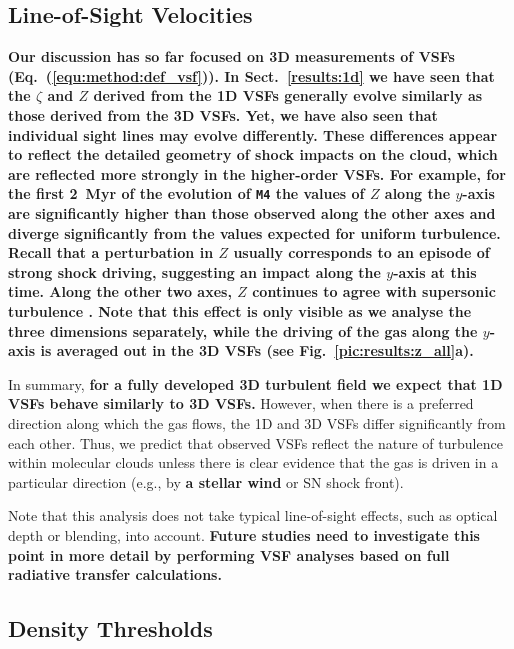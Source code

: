 \subsection{Line-of-Sight Velocities}\label{discussion:1d}

\textbf{Our discussion has so far focused on 3D measurements of VSFs (Eq.~(\ref{equ:method:def_vsf})).
In Sect.~\ref{results:1d} we have seen that the $\zeta$ and $Z$ derived from the 1D VSFs generally evolve similarly as those derived from the 3D VSFs.
Yet, we have also seen that individual sight lines may evolve differently.
These differences appear to reflect the detailed geometry of shock impacts on the cloud, which are reflected more strongly in the higher-order VSFs.
For example, for the first 2~Myr of the evolution of \texttt{M4} the values of $Z$ along the $y$-axis are significantly higher than those observed along the other axes and diverge significantly from the values expected for uniform turbulence.
Recall that a perturbation in $Z$ usually corresponds to an episode of strong shock driving, suggesting an impact along the $y$-axis at this time. 
Along the other two axes, $Z$ continues to agree with supersonic turbulence \citep{Boldyrev2002}.
Note that this effect is only visible as we analyse the three dimensions separately, while the driving of the gas along the $y$-axis is averaged out in the 3D VSFs (see Fig.~\ref{pic:results:z_all}a).
}

In summary, \textbf{for a fully developed 3D turbulent field we expect that 1D VSFs behave similarly to 3D VSFs.}
However, when there is a preferred direction along which the gas flows, the 1D and 3D VSFs differ significantly from each other. 
Thus, we predict that observed VSFs reflect the nature of turbulence within molecular clouds unless there is clear evidence that the gas is driven in a particular direction (e.g., by \textbf{a stellar wind} or SN shock front).

Note that this analysis does not take typical line-of-sight effects, such as optical depth or blending, into account. 
\textbf{Future studies need to investigate this point in more detail by performing VSF analyses based on full radiative transfer calculations. }



\subsection{Density Thresholds}\label{discussion:densthres}


